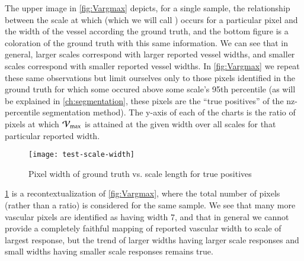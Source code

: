 %
The upper image in \cref{fig:Vargmax} depicts, for a single sample, the relationship between the scale at which \Vmax (which we will call \Vargmax) occurs for a particular pixel and the width of the vessel according the ground truth, and the bottom figure is a coloration of the ground truth with this same information. We can see that in general, larger scales correspond with larger reported vessel widths, and smaller scales correspond with smaller reported vessel widths.
In \cref{fig:Vargmax} we repeat these same observations but limit ourselves only to those pixels identified in the ground truth for which some \Vsigma  occured above some scale's 95th percentile (as will be explained in \cref{ch:segmentation}, these pixels are the ``true positives'' of the nz-percentile segmentation method). The y-axis of each of the charts is the ratio of pixels at which $\mathcal{V}_{\max}$ is attained at the given width over all scales for that particular reported width.



\begin{figure}[p]
  \texttt{[image: test-scale-width]}
  \caption{Pixel width of ground truth vs. scale length for true positives}
  \label{fig:scale_for_max_frangi_score_seaborn}
\end{figure}

\cref{fig:scale_for_max_frangi_score_seaborn} is a recontextualization of \cref{fig:Vargmax}, where the total number of pixels (rather than a ratio) is considered for the same sample.
We see that many more vascular pixels are identified as having width 7, and that in general we cannot provide a completely faithful mapping of reported vascular width to scale of largest response, but the trend of larger widths having larger scale responses and small widths having smaller scale responses remains true.
